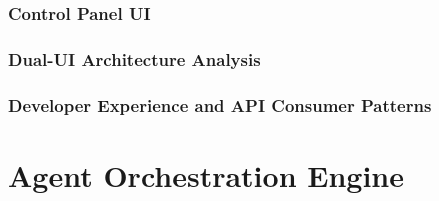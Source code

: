 \documentclass[a4paper,twoside]{sapthesis}
\begin{document}
\subsection{Control Panel UI}

\subsection{Dual-UI Architecture Analysis}
%
%

\subsection{Developer Experience and API Consumer Patterns}


\chapter{Agent Orchestration Engine}
\label{ch:orchestration}
\end{document}
